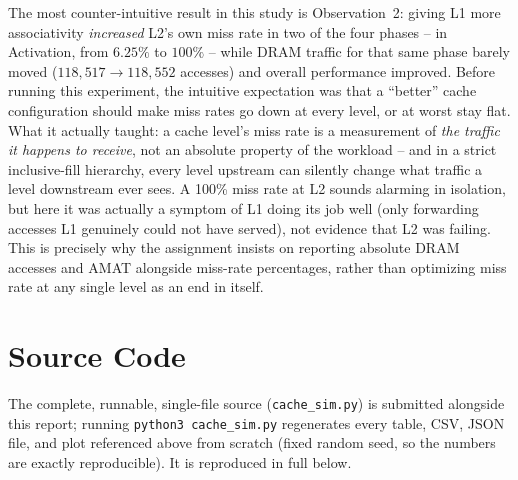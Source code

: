 \documentclass[11pt]{article}
\begin{document}
The most counter-intuitive result in this study is Observation~2: giving
L1 more associativity \emph{increased} L2's own miss rate in two of the
four phases -- in Activation, from $6.25\%$ to $100\%$ -- while DRAM
traffic for that same phase barely moved ($118{,}517 \to 118{,}552$
accesses) and overall performance improved. Before running this
experiment, the intuitive expectation was that a ``better'' cache
configuration should make miss rates go down at every level, or at worst
stay flat. What it actually taught: a cache level's miss rate is a
measurement of \emph{the traffic it happens to receive}, not an
absolute property of the workload -- and in a strict inclusive-fill
hierarchy, every level upstream can silently change what traffic a level
downstream ever sees. A 100\% miss rate at L2 sounds alarming in
isolation, but here it was actually a symptom of L1 doing its job well
(only forwarding accesses L1 genuinely could not have served), not
evidence that L2 was failing. This is precisely why the assignment insists
on reporting absolute DRAM accesses and AMAT alongside miss-rate
percentages, rather than optimizing miss rate at any single level as an
end in itself.

\appendix
\section{Source Code}

The complete, runnable, single-file source
(\texttt{cache\_sim.py}) is submitted alongside this report; running
\texttt{python3 cache\_sim.py} regenerates every table, CSV, JSON file,
and plot referenced above from scratch (fixed random seed, so the numbers
are exactly reproducible). It is reproduced in full below.


\end{document}

